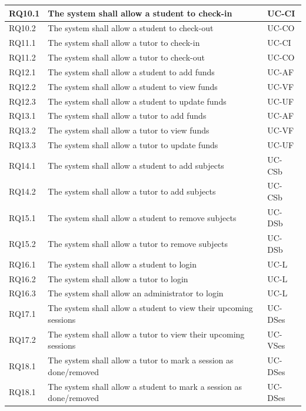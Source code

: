 \documentclass[12pt]{article}
\begin{document}
{\begin{longtable}{| l | p{10cm}| l |}
				RQ10.1 & The system shall allow a student to check-in  & UC-CI \\ \hline	
				RQ10.2 & The system shall allow a student to check-out  & UC-CO \\ \hline
				RQ11.1 & The system shall allow a tutor to check-in  & UC-CI \\ 
\hline	
				RQ11.2 & The system shall allow a tutor to check-out  & UC-CO \\ \hline
				RQ12.1 & The system shall allow a student to add funds &UC-AF\\ \hline
				RQ12.2 & The system shall allow a student to view funds &UC-VF\\ \hline
				RQ12.3 & The system shall allow a student to update funds &UC-UF\\ \hline
				RQ13.1 & The system shall allow a tutor to add funds &UC-AF\\ \hline
				RQ13.2 & The system shall allow a tutor to view funds &UC-VF\\ \hline
				RQ13.3 & The system shall allow a tutor to update funds &UC-UF\\ \hline
				RQ14.1 & The system shall allow a student to add subjects &UC-CSb\\ \hline
				RQ14.2 & The system shall allow a tutor to add subjects &UC-CSb\\ \hline				
				RQ15.1 & The system shall allow a student to remove subjects &UC-DSb\\ \hline
				RQ15.2 & The system shall allow a tutor to remove subjects &UC-DSb\\ \hline				
				RQ16.1 & The system shall allow a student to login &UC-L\\ \hline
				RQ16.2 & The system shall allow a tutor to login &UC-L\\ \hline
				RQ16.3 & The system shall allow an administrator to login &UC-L\\ \hline
				RQ17.1 & The system shall allow a student to view their upcoming sessions  &UC-DSes\\ \hline
				RQ17.2 & The system shall allow a tutor to view their upcoming sessions  &UC-VSes\\ \hline
				RQ18.1 & The system shall allow a tutor to mark a session as done/removed &UC-DSes\\ \hline
				RQ18.1 & The system shall allow a student to mark a session as done/removed &UC-DSes\\ \hline
		
\end{longtable}
}
\end{document}
